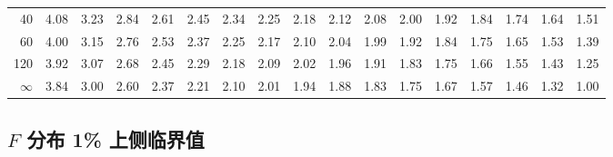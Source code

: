 \begin{center}
\begin{tabular}{r|cccccccccccccccc}
40 & 4.08 & 3.23 & 2.84 & 2.61 & 2.45 & 2.34 & 2.25 & 2.18 & 2.12 & 2.08 & 2.00 & 1.92 & 1.84 & 1.74 & 1.64 & 1.51\\
60 & 4.00 & 3.15 & 2.76 & 2.53 & 2.37 & 2.25 & 2.17 & 2.10 & 2.04 & 1.99 & 1.92 & 1.84 & 1.75 & 1.65 & 1.53 & 1.39\\
120 & 3.92 & 3.07 & 2.68 & 2.45 & 2.29 & 2.18 & 2.09 & 2.02 & 1.96 & 1.91 & 1.83 & 1.75 & 1.66 & 1.55 & 1.43 & 1.25\\
$\infty$ & 3.84 & 3.00 & 2.60 & 2.37 & 2.21 & 2.10 & 2.01 & 1.94 & 1.88 & 1.83 & 1.75 & 1.67 & 1.57 & 1.46 & 1.32 & 1.00\\\bottomrule
\end{tabular}\end{center}
\subsection{\texorpdfstring{$F$}{F} 分布 1\% 上侧临界值}
